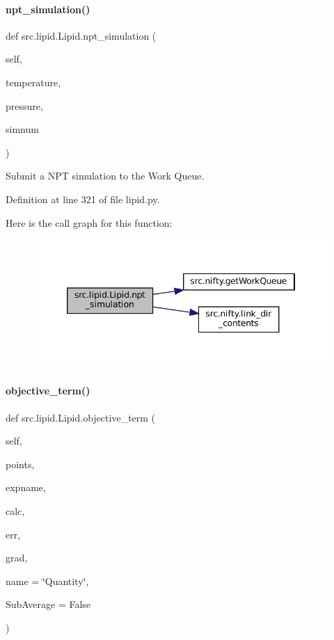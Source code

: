 \paragraph{\texorpdfstring{npt\+\_\+simulation()}{npt\_simulation()}}
{\footnotesize\ttfamily def src.\+lipid.\+Lipid.\+npt\+\_\+simulation (\begin{DoxyParamCaption}\item[{}]{self,  }\item[{}]{temperature,  }\item[{}]{pressure,  }\item[{}]{simnum }\end{DoxyParamCaption})}



Submit a N\+PT simulation to the Work Queue. 



Definition at line 321 of file lipid.\+py.

Here is the call graph for this function\+:
\nopagebreak
\begin{figure}[H]
\begin{center}
\leavevmode
\includegraphics[width=346pt]{classsrc_1_1lipid_1_1Lipid_acc748653a328afae3ab3c61d7e69314d_cgraph}
\end{center}
\end{figure}
\mbox{\label{classsrc_1_1lipid_1_1Lipid_a6c3b17049534baa97adc428f2e60c4d7}} 
\paragraph{\texorpdfstring{objective\+\_\+term()}{objective\_term()}}
{\footnotesize\ttfamily def src.\+lipid.\+Lipid.\+objective\+\_\+term (\begin{DoxyParamCaption}\item[{}]{self,  }\item[{}]{points,  }\item[{}]{expname,  }\item[{}]{calc,  }\item[{}]{err,  }\item[{}]{grad,  }\item[{}]{name = {\ttfamily \char`\"{}Quantity\char`\"{}},  }\item[{}]{Sub\+Average = {\ttfamily False} }\end{DoxyParamCaption})}



